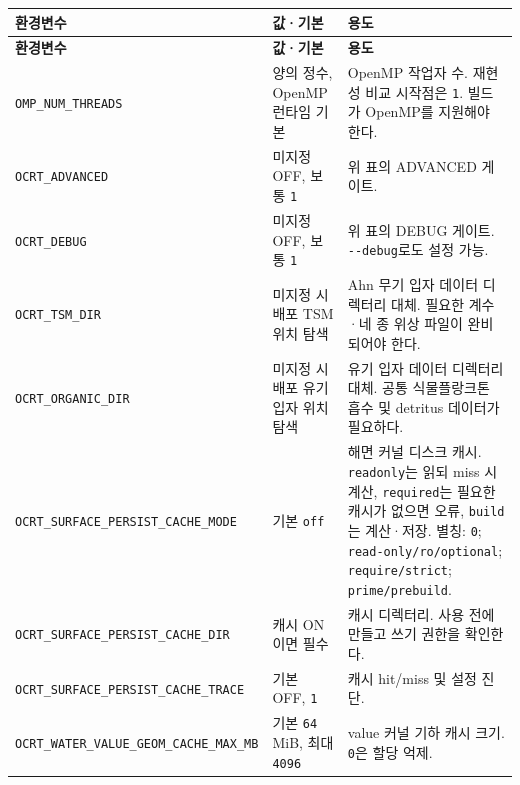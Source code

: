 {\TableFont
\begin{longtable}{@{}>{\raggedright\arraybackslash}p{}>{\raggedright\arraybackslash}p{}>{\raggedright\arraybackslash}p{}@{}}
\toprule
\textbf{환경변수} & \textbf{값·기본} & \textbf{용도} \\
\midrule
\endfirsthead
\toprule
\textbf{환경변수} & \textbf{값·기본} & \textbf{용도} \\
\midrule
\endhead
\bottomrule
\endfoot
\texttt{OMP\_\allowbreak{}NUM\_\allowbreak{}THREADS} & 양의 정수, OpenMP 런타임 기본 & OpenMP 작업자 수. 재현성 비교 시작점은 \texttt{1}. 빌드가 OpenMP를 지원해야 한다. \\
\texttt{OCRT\_\allowbreak{}ADVANCED} & 미지정 OFF, 보통 \texttt{1} & 위 표의 ADVANCED 게이트. \\
\texttt{OCRT\_\allowbreak{}DEBUG} & 미지정 OFF, 보통 \texttt{1} & 위 표의 DEBUG 게이트. \texttt{-\allowbreak{}-\allowbreak{}debug}로도 설정 가능. \\
\texttt{OCRT\_\allowbreak{}TSM\_\allowbreak{}DIR} & 미지정 시 배포 TSM 위치 탐색 & Ahn 무기 입자 데이터 디렉터리 대체. 필요한 계수·네 종 위상 파일이 완비되어야 한다. \\
\texttt{OCRT\_\allowbreak{}ORGANIC\_\allowbreak{}DIR} & 미지정 시 배포 유기 입자 위치 탐색 & 유기 입자 데이터 디렉터리 대체. 공통 식물플랑크톤 흡수 및 detritus 데이터가 필요하다. \\
\texttt{OCRT\_\allowbreak{}SURFACE\_\allowbreak{}PERSIST\_\allowbreak{}CACHE\_\allowbreak{}MODE} & 기본 \texttt{off} & 해면 커널 디스크 캐시. \texttt{readonly}는 읽되 miss 시 계산, \texttt{required}는 필요한 캐시가 없으면 오류, \texttt{build}는 계산·저장. 별칭: \texttt{0}; \texttt{read-\allowbreak{}only/\allowbreak{}ro/\allowbreak{}optional}; \texttt{require/\allowbreak{}strict}; \texttt{prime/\allowbreak{}prebuild}. \\
\texttt{OCRT\_\allowbreak{}SURFACE\_\allowbreak{}PERSIST\_\allowbreak{}CACHE\_\allowbreak{}DIR} & 캐시 ON이면 필수 & 캐시 디렉터리. 사용 전에 만들고 쓰기 권한을 확인한다. \\
\texttt{OCRT\_\allowbreak{}SURFACE\_\allowbreak{}PERSIST\_\allowbreak{}CACHE\_\allowbreak{}TRACE} & 기본 OFF, \texttt{1} & 캐시 hit/miss 및 설정 진단. \\
\texttt{OCRT\_\allowbreak{}WATER\_\allowbreak{}VALUE\_\allowbreak{}GEOM\_\allowbreak{}CACHE\_\allowbreak{}MAX\_\allowbreak{}MB} & 기본 \texttt{64} MiB, 최대 \texttt{4096} & value 커널 기하 캐시 크기. \texttt{0}은 할당 억제. \\

\end{longtable}}
